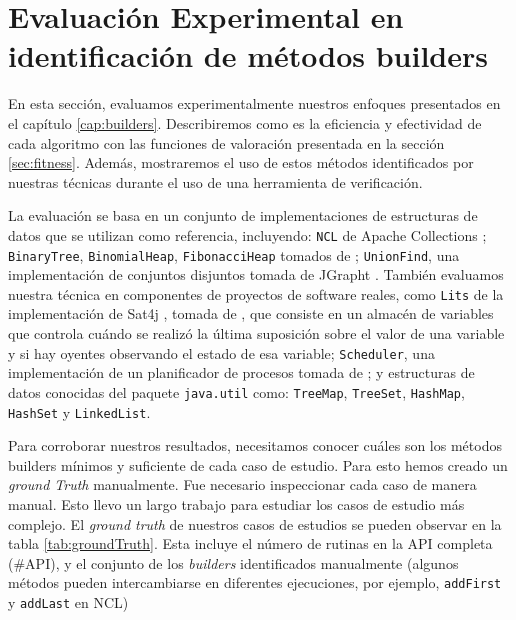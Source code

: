 
\section{Evaluación Experimental en identificación de métodos builders}
En esta sección, evaluamos experimentalmente nuestros enfoques presentados en el capítulo \ref{cap:builders}. Describiremos como es la eficiencia y efectividad de cada algoritmo con las funciones de valoración presentada en la sección \ref{sec:fitness}. Además, mostraremos el uso de estos métodos identificados por nuestras técnicas durante el uso de una herramienta de verificación.

La evaluación se basa en un conjunto de implementaciones de estructuras de datos que se utilizan como referencia, incluyendo: \verb"NCL" de Apache Collections \cite{apache}; \verb"BinaryTree", \verb"BinomialHeap", \verb"FibonacciHeap" tomados de \cite{Visser:2006}; \verb"UnionFind", una implementación de conjuntos disjuntos tomada de JGrapht \cite{jgrapht}. También evaluamos nuestra técnica en componentes de proyectos de software reales, como \verb"Lits" de la implementación de Sat4j \cite{sat4j}, tomada de \cite{Loncaric:2018}, que consiste en un almacén de variables que controla cuándo se realizó la última suposición sobre el valor de una variable y si hay oyentes observando el estado de esa variable; \verb"Scheduler", una implementación de un planificador de procesos tomada de \cite{sir}; y estructuras de datos conocidas del paquete \verb"java.util" como: \verb"TreeMap", \verb"TreeSet", \verb"HashMap", \verb"HashSet" y \verb"LinkedList". 

Para corroborar nuestros resultados, necesitamos conocer cuáles son los métodos builders mínimos y suficiente de cada caso de estudio. Para esto hemos creado un \emph{ground Truth} manualmente. Fue necesario inspeccionar cada caso de manera manual. Esto llevo un largo trabajo para estudiar los casos de estudio más complejo. El \emph{ground truth} de nuestros casos de estudios se pueden observar en la tabla \ref{tab:groundTruth}. Esta incluye el número de rutinas en la API completa (\#API), y el conjunto de los \emph{builders} identificados manualmente (algunos métodos pueden intercambiarse en diferentes ejecuciones, por ejemplo, \texttt{addFirst} y \texttt{addLast} en NCL)
    
